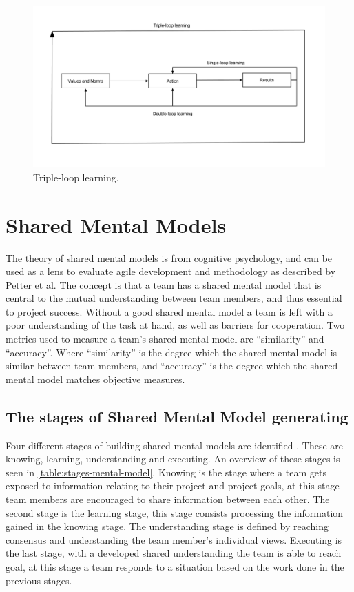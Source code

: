 \begin{figure}[!h]
	\centering
	\includegraphics[width=\textwidth, keepaspectratio]{figures/triple-loop.png}
	\caption{Triple-loop learning.}
	\label{figure:triple-loop}
\end{figure}

\clearpage


\section{Shared Mental Models}
\label{section:mental-models}
The theory of shared mental models is from cognitive psychology, and can be used as a lens to evaluate agile development and methodology as described by Petter et al\cite{Petter2013}. The concept is that a team has a shared mental model that is central to the mutual understanding between team members, and thus essential to project success. Without a good shared mental model a team is left with a poor understanding of the task at hand, as well as barriers for cooperation. Two metrics used to measure a team's shared mental model are ``similarity'' and ``accuracy''. Where ``similarity'' is the degree which the shared mental model is similar between team members, and ``accuracy'' is the degree which the shared mental model matches objective measures. 

\subsection{The stages of Shared Mental Model generating}

\label{section:mental-models-stages}
	
Four different stages of building shared mental models are identified \cite{Petter2013}. These are knowing, learning, understanding and executing. An overview of these stages is seen in  \autoref{table:stages-mental-model}. Knowing is the stage where a team gets exposed to information relating to their project and project goals, at this stage team members are encouraged to share information between each other. The second stage is the learning stage, this stage consists processing the information gained in the knowing stage. The understanding stage is defined by reaching consensus and understanding the team member's individual views. Executing is the last stage, with a developed shared understanding the team is able to reach goal, at this stage a team responds to a situation based on the work done in the previous stages.

